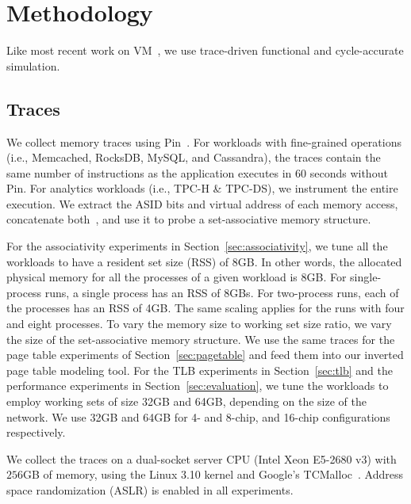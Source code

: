 \section{Methodology}
\label{sec:methodology}

Like most recent work on VM~\cite{basu:efficient, pham:increasing, pham:colt, bhattacharjee:large-reach, barr:spectlb, papadopoulou:prediction-based, saulsbury:recently-based}, we use trace-driven functional and cycle-accurate simulation.

\subsection{Traces}

We collect memory traces using Pin~\cite{luk:pin}. For workloads with fine-grained operations (i.e., Memcached, RocksDB, MySQL, and Cassandra), the traces contain the same number of instructions as the application executes in 60 seconds without Pin. For analytics workloads (i.e., TPC-H \& TPC-DS), we instrument the entire execution. We extract the ASID bits and virtual address of each memory access, concatenate both~\cite{basu:reducing, yoon:revisiting},  and use it to probe a set-associative memory structure. 

For the associativity experiments in Section~\ref{sec:associativity}, we tune all the workloads to have a resident set size (RSS) of 8GB. In other words, the allocated physical memory for all the processes of a given workload is 8GB. For single-process runs, a single process has an RSS of 8GBs. For two-process runs, each of the processes has an RSS of 4GB. The same scaling applies for the runs with four and eight processes. To vary the memory size to working set size ratio, we vary the size of the set-associative memory structure. We use the same traces for the page table experiments of Section~\ref{sec:pagetable} and feed them into our inverted page table modeling tool. For the TLB experiments in Section~\ref{sec:tlb} and the performance experiments in Section~\ref{sec:evaluation}, we tune the workloads to employ working sets of size 32GB and 64GB, depending on the size of the network. We use 32GB and 64GB for 4- and 8-chip, and 16-chip configurations respectively.

We collect the traces on a dual-socket server CPU (Intel Xeon E5-2680 v3) with $256$GB of memory, using the Linux 3.10 kernel and Google's TCMalloc~\cite{google:tcmalloc}. Address space randomization (ASLR) is enabled in all experiments.

